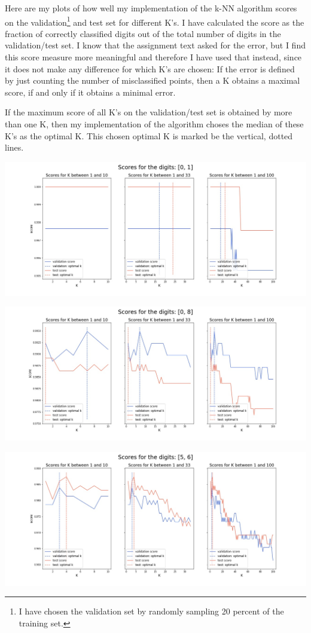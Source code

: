 Here are my plots of how well my implementation of the k-NN algorithm scores on the validation\footnote{I have chosen the validation set by randomly sampling 20 percent of the training set.} and test set for different K's. I have calculated the score as the fraction of correctly classified digits out of the total number of digits in the validation/test set. I know that the assignment text asked for the error, but I find this score measure more meaningful and therefore I have used that instead, since it does not make any difference for which K's are chosen: If the error is defined by just counting the number of misclassified points, then a K obtains a maximal score, if and only if it obtains a minimal error.

If the maximum score of all K's on the validation/test set is obtained by more than one K, then my implementation of the algorithm choses the median of these K's as the optimal K. This chosen optimal K is marked be the vertical, dotted lines.

\includegraphics[scale = 0.3]{nearest_neighbour/digits_0_1.jpg}

\includegraphics[scale = 0.3]{nearest_neighbour/digits_0_8.jpg}

\includegraphics[scale = 0.3]{nearest_neighbour/digits_5_6.jpg}

